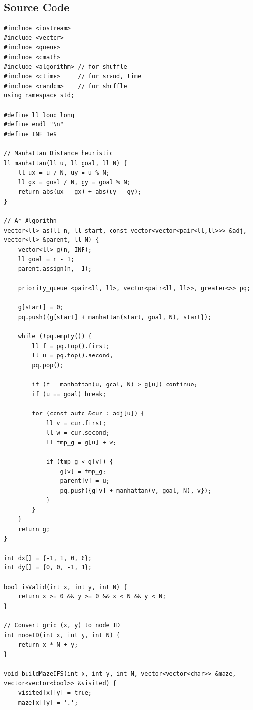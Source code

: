 \documentclass[a4paper,12pt]{article}
\begin{document}
\subsection{Source Code}
\begin{tcolorbox}[breakable, enhanced, colback=white, title={Complete Version}, colframe=gray!40]
\begin{lstlisting}
#include <iostream> 
#include <vector>
#include <queue> 
#include <cmath>
#include <algorithm> // for shuffle
#include <ctime>     // for srand, time
#include <random>    // for shuffle
using namespace std;

#define ll long long
#define endl "\n"
#define INF 1e9

// Manhattan Distance heuristic
ll manhattan(ll u, ll goal, ll N) {
    ll ux = u / N, uy = u % N;
    ll gx = goal / N, gy = goal % N;
    return abs(ux - gx) + abs(uy - gy); 
}

// A* Algorithm
vector<ll> as(ll n, ll start, const vector<vector<pair<ll,ll>>> &adj, vector<ll> &parent, ll N) {
    vector<ll> g(n, INF);
    ll goal = n - 1; 
    parent.assign(n, -1);

    priority_queue <pair<ll, ll>, vector<pair<ll, ll>>, greater<>> pq; 

    g[start] = 0; 
    pq.push({g[start] + manhattan(start, goal, N), start});   

    while (!pq.empty()) { 
        ll f = pq.top().first; 
        ll u = pq.top().second;
        pq.pop();  

        if (f - manhattan(u, goal, N) > g[u]) continue;
        if (u == goal) break; 

        for (const auto &cur : adj[u]) {
            ll v = cur.first;
            ll w = cur.second; 
            ll tmp_g = g[u] + w;  

            if (tmp_g < g[v]) {
                g[v] = tmp_g; 
                parent[v] = u;
                pq.push({g[v] + manhattan(v, goal, N), v});
            }
        }
    }
    return g; 
}

int dx[] = {-1, 1, 0, 0}; 
int dy[] = {0, 0, -1, 1};

bool isValid(int x, int y, int N) {
    return x >= 0 && y >= 0 && x < N && y < N;
}

// Convert grid (x, y) to node ID
int nodeID(int x, int y, int N) {
    return x * N + y;
}

void buildMazeDFS(int x, int y, int N, vector<vector<char>> &maze, vector<vector<bool>> &visited) {
    visited[x][y] = true;
    maze[x][y] = '.';


\end{lstlisting}
\end{tcolorbox}
\end{document}
